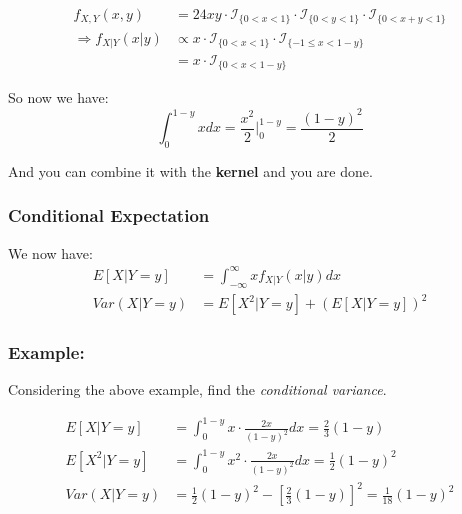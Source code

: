 \documentclass{article}
\begin{document}
\begin{enumerate}
    \begin{equation*}
        \begin{split}
            f_{X,Y}(x,y) &= 24xy \cdot \mathcal{I}_{\{0<x<1\}}\cdot \mathcal{I}_{\{0<y<1\}}\cdot \mathcal{I}_{\{0<x+y<1\}}\\
            \Rightarrow f_{X|Y}(x|y) &\propto x \cdot \mathcal{I}_{\{0<x<1\}}\cdot \mathcal{I}_{\{-1\leq x<1-y\}}\\
            &= x \cdot \mathcal{I}_{\{0<x<1-y\}}
        \end{split}
    \end{equation*}

    So now we have:
    \begin{equation*}
        \int_0^{1-y}x dx = \frac{x^2}{2}\Biggr|^{1-y}_0 = \frac{(1-y)^2}{2}
    \end{equation*}

    And you can combine it with the \textbf{kernel} and you are done.
\end{enumerate}

\subsubsection{Conditional Expectation}

We now have:
\begin{equation*}
    \begin{split}
        E[X|Y=y] &= \int_{-\infty}^\infty x f_{X|Y}(x|y)dx\\
        Var(X|Y=y) &= E[X^2 | Y=y] + \left(E[X|Y=y] \right)^2
    \end{split}
\end{equation*}

\subsubsection*{Example:}

Considering the above example, find the \textit{conditional variance}.

\begin{equation*}
    \begin{split}
        E[X|Y=y] &= \int_0^{1-y} x \cdot \frac{2x}{(1-y)^2}dx = \frac{2}{3}(1-y)\\
        E[X^2|Y=y] &= \int_0^{1-y} x^2 \cdot \frac{2x}{(1-y)^2}dx = \frac{1}{2}(1-y)^2\\
        Var(X|Y=y) &= \frac{1}{2}(1-y)^2 - \left[\frac{2}{3}(1-y)\right]^2 = \frac{1}{18}(1-y)^2
    \end{split}
\end{equation*}
\end{document}
